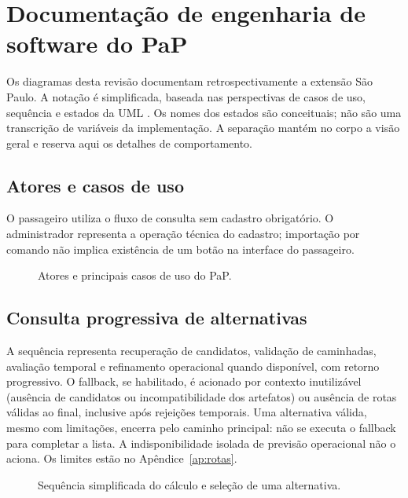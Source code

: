 \chapter{Documentação de engenharia de software do PaP}\label{ap:engenharia}
Os diagramas desta revisão documentam retrospectivamente a extensão São Paulo. A notação é simplificada, baseada nas perspectivas de casos de uso, sequência e estados da UML \citep{uml251}. Os nomes dos estados são conceituais; não são uma transcrição de variáveis da implementação. A separação mantém no corpo a visão geral e reserva aqui os detalhes de comportamento.
\section{Atores e casos de uso}
O passageiro utiliza o fluxo de consulta sem cadastro obrigatório. O administrador representa a operação técnica do cadastro; importação por comando não implica existência de um botão na interface do passageiro.

\begin{figure}[H]
\centering
\caption{Atores e principais casos de uso do PaP.}\label{fig:casos-pap}
\end{figure}

\section{Consulta progressiva de alternativas}
A sequência representa recuperação de candidatos, validação de caminhadas, avaliação temporal e refinamento operacional quando disponível, com retorno progressivo. O fallback, se habilitado, é acionado por contexto inutilizável (ausência de candidatos ou incompatibilidade dos artefatos) ou ausência de rotas válidas ao final, inclusive após rejeições temporais. Uma alternativa válida, mesmo com limitações, encerra pelo caminho principal: não se executa o fallback para completar a lista. A indisponibilidade isolada de previsão operacional não o aciona. Os limites estão no Apêndice~\ref{ap:rotas}.

\begin{figure}[H]
\centering
\caption{Sequência simplificada do cálculo e seleção de uma alternativa.}\label{fig:sequencia-pap}
\end{figure}

